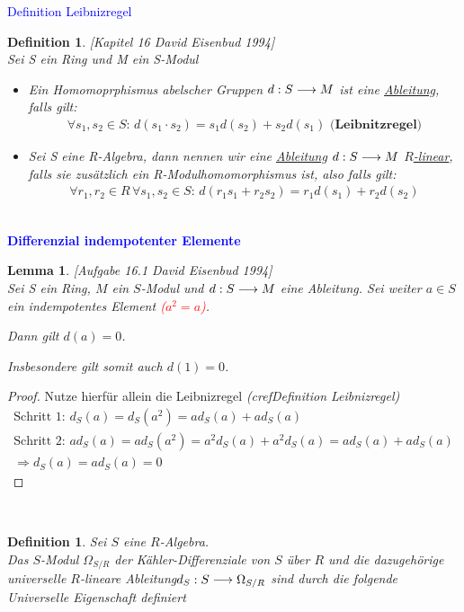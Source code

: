 \documentclass[10pt,a4paper]{report}
\newcommand{\ModulsOfDifferenzials}{David Eisenbud 1994}
\newcounter{Aussage}[chapter]
\newtheorem{lemma}[Aussage]{Lemma}
\newtheorem{definition}[Aussage]{Definition}
\newcommand{\functionfront}[3]{\nolinebreak{#1:#2 \longrightarrow #3}}
\newcommand{\divR}[2]{\Omega_{#1/#2}}
\newcommand{\divf}[1]{d_{#1}}
\begin{document}
\textcolor{blue}{Definition Leibnizregel}
\begin{definition}\label{Definition Leibnizregel} \textit{[Kapitel 16 \ModulsOfDifferenzials]}\\
Sei S ein Ring und M ein S-Modul
\begin{itemize}
\item[]Ein Homomoprphismus abelscher Gruppen $\functionfront{d}{S}{M}$ ist eine \underline{Ableitung}, falls gilt:
\begin{gather*}
\forall s_1,s_2 \in S :\, d(s_1 \cdot s_2) = s_1d(s_2) + s_2d(s_1) \textbf{ (Leibnitzregel)}
\end{gather*}
\item[]Sei S eine R-Algebra, dann nennen wir eine \underline{Ableitung} $\functionfront{d}{S}{M}$ \underline{$R$-linear}, falls sie zusätzlich ein R-Modulhomomorphismus ist, also falls gilt:
\begin{gather*}
\forall r_1,r_2 \in R \, \forall s_1,s_2 \in S : \, d(r_1 s_1 + r_2 s_2) = r_1 d(s_1) + r_2 d(s_2)
\end{gather*}
\end{itemize}
\end{definition}


\ \\
\textcolor{blue}{\textbf{Differenzial indempotenter Elemente}}
\begin{lemma}\label{Differenzial indempotenter Elemente} \textit{[Aufgabe 16.1 \ModulsOfDifferenzials]} \\
Sei S ein Ring, $M$ ein $S$-Modul und $\functionfront{d}{S}{M}$ eine Ableitung. Sei weiter $a \in S$ ein indempotentes Element \textcolor{red}{($a^2 = a$)}.
\begin{center}
Dann gilt $d(a) = 0$. 
\end{center}
Insbesondere gilt somit auch $d(1) = 0$.
\end{lemma}
\begin{proof}
Nutze hierfür allein die Leibnizregel \textit{(cref{Definition Leibnizregel})}
\begin{gather*}
\text{Schritt 1: } \divf{S}(a) = \divf{S}(a^2) = a\divf{S}(a) + a\divf{S}(a) \\
\text{Schritt 2: } a\divf{S}(a) = a\divf{S}(a^2) = a^2\divf{S}(a) + a^2\divf{S}(a) = a\divf{S}(a) + a\divf{S}(a)\\
\Rightarrow \divf{S}(a) = a\divf{S}(a) = 0
\end{gather*}
\end{proof}


\ \\
\begin{definition}
Sei $S$ eine $R$-Algebra.\\
Das $S$-Modul $\divR{S}{R}$ der Kähler-Differenziale von $S$ über $R$ und die dazugehörige universelle $R$-lineare Ableitung$\functionfront{\divf{S}}{S}{\divR{S}{R}}$ sind durch die folgende Universelle Eigenschaft definiert
\end{definition}
\end{document}
